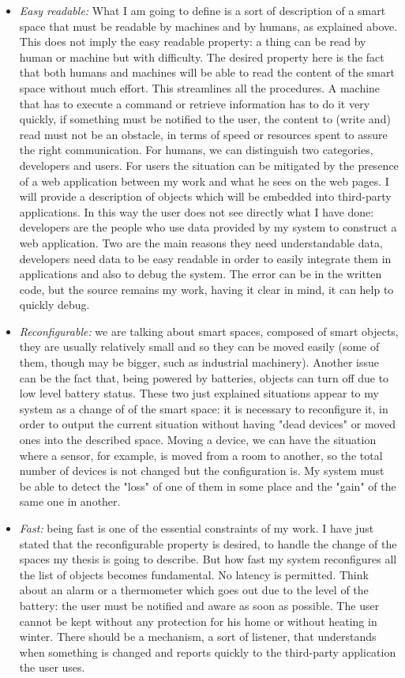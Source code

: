 \begin{itemize}
	\item \textit{Easy readable:} What I am going to define is a sort of description of a smart space that must be readable by machines and by humans, as explained above. This does not imply the easy readable property: a thing can be read by human or machine but with difficulty. The desired property here is the fact that both humans and machines will be able to read the content of the smart space without much effort. This streamlines all the procedures. A machine that has to execute a command or retrieve information has to do it very quickly, if something must be notified to the user, the content to (write and) read must not be an obstacle, in terms of speed or resources spent to assure the right communication. For humans, we can distinguish two categories, developers and users. For users the situation can be mitigated by the presence of a web application between my work and what he sees on the web pages. I will provide a description of objects which will be embedded into third-party applications. In this way the user does not see directly what I have done: developers are the people who use data provided by my system to construct a web application. Two are the main reasons they need understandable data, developers need data to be easy readable in order to easily integrate them in applications and also to debug the system. The error can be in the written code, but the source remains my work, having it clear in mind, it can help to quickly debug.
	
	\item \textit{Reconfigurable:} we are talking about smart spaces, composed of smart objects, they are usually relatively small and so they can be moved easily (some of them, though may be bigger, such as industrial machinery). Another issue can be the fact that, being powered by batteries, objects can turn off due to low level battery status. These two just explained situations appear to my system as a change of of the smart space: it is necessary to reconfigure it, in order to output the current situation without having "dead devices" or moved ones into the described space. Moving a device, we can have the situation where a sensor, for example, is moved from a room to another, so the total number of devices is not changed but the configuration is. My system must be able to detect the "loss" of one of them in some place and the "gain" of the same one in another. 
	
	\item \textit{Fast:} being fast is one of the essential constraints of my work. I have just stated that the reconfigurable property is desired, to handle the change of the spaces my thesis is going to describe. But how fast my system reconfigures all the list of objects becomes fundamental. No latency is permitted. Think about an alarm or a thermometer which goes out due to the level of the battery: the user must be notified and aware as soon as possible. The user cannot be kept without any protection for his home or without heating in winter. There should be a mechanism, a sort of listener, that understands when something is changed and reports quickly to the third-party application the user uses.
	

\end{itemize}
